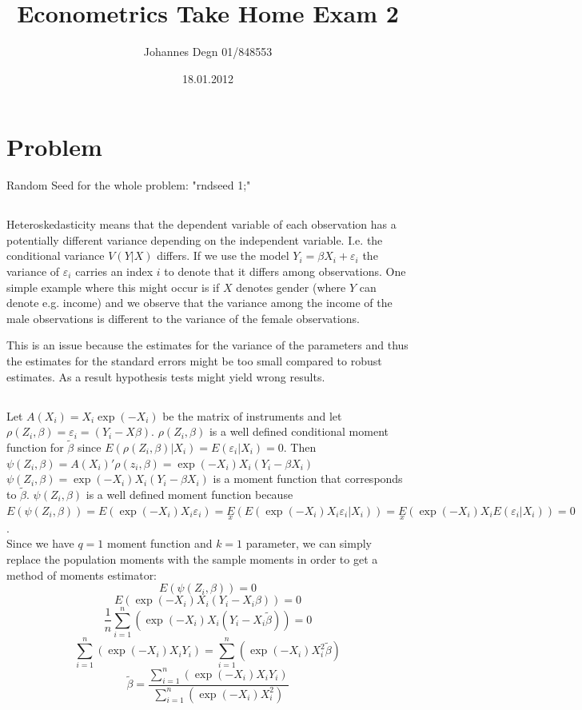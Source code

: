 \documentclass[11pt]{article}
\title{\textbf{Econometrics Take Home Exam 2}}
\author{Johannes Degn 01/848553}
\date{18.01.2012}
\theoremstyle{break}
\begin{document}
\maketitle


\section{Problem}
Random Seed for the whole problem: "rndseed 1;"

\subsection{}
Heteroskedasticity means that the dependent variable of each observation has a potentially different variance depending on the independent variable. I.e. the conditional variance $V(Y|X)$ differs. If we use the model $Y_i = \beta X_i + \varepsilon_i$ the variance of $\varepsilon_i$ carries an index $i$ to denote that it differs among observations. One simple example where this might occur is if $X$ denotes gender (where $Y$ can denote e.g. income) and we observe that the variance among the income of the male observations is different to the variance of the female observations.

This is an issue because the estimates for the variance of the parameters and thus the estimates for the standard errors might be too small compared to robust estimates. As a result hypothesis tests might yield wrong results.


\subsection{}
Let $A(X_i) = X_i\exp(-X_i)$ be the matrix of instruments and let $\rho(Z_i, \beta) = \varepsilon_i = (Y_i - X\beta)$. $\rho(Z_i, \beta)$ is a well defined conditional moment function for $\tilde{\beta}$ since $E(\rho(Z_i, \beta)| X_i) = E(\varepsilon_i | X_i) = 0$. Then $\psi(Z_i, \beta) = A(X_i)'\rho(z_i, \beta) = \exp(-X_i)X_i(Y_i-\beta X_i)$
\\
$\psi(Z_i, \beta) = \exp(-X_i)X_i(Y_i - \beta X_i)$ is a moment function that corresponds to $\tilde{\beta}$. $\psi(Z_i, \beta)$ is a well defined moment function because $E(\psi(Z_i, \beta)) = E(\exp(-X_i)X_i\varepsilon_i) = \underset{x}{E}(E(\exp(-X_i)X_i\varepsilon_i|X_i)) = \underset{x}{E}(\exp(-X_i)X_iE(\varepsilon_i|X_i)) = 0$. \\

Since we have $q=1$ moment function and $k=1$ parameter, we can simply replace the population moments with the sample moments in order to get a method of moments estimator: \\
$$E(\psi(Z_i, \beta)) = 0$$
$$E(\exp(-X_i)X_i(Y_i -X_i\beta)) = 0$$
$$\frac{1}{n}\displaystyle \sum_{i=1}^n(\exp(-X_i)X_i(Y_i -X_i\tilde{\beta})) = 0$$
$$\displaystyle \sum_{i=1}^n(\exp(-X_i)X_iY_i) = \displaystyle \sum_{i=1}^n(\exp(-X_i)X_i^2\tilde{\beta})$$
$$\tilde{\beta} = \frac{\sum_{i=1}^n(\exp(-X_i)X_iY_i)}{\sum_{i=1}^n(\exp(-X_i)X_i^2
)}$$
\end{document}
